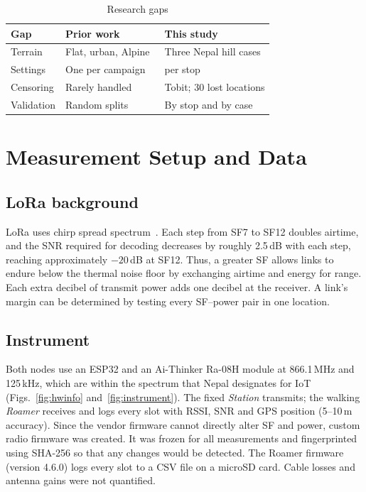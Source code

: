 \documentclass[conference]{IEEEtran}
\newcommand{\dB}{\,dB\xspace}
\begin{document}
\begin{table}[t]
\caption{Research gaps}\label{tab:gap}
\centering
\footnotesize
\setlength{\tabcolsep}{3pt}
\begin{tabular}{@{}>{\raggedright\arraybackslash}p{1.6cm}>{\raggedright\arraybackslash}p{3.1cm}>{\raggedright\arraybackslash}p{3.0cm}@{}}
\toprule
Gap & Prior work & This study \\
\midrule
Terrain & Flat, urban, Alpine~\cite{petajajarvi2015,rademacher2021,bianco2020} & Three Nepal hill cases \\
Settings & One per campaign~\cite{bianco2020} & 18 per stop \\
Censoring & Rarely handled~\cite{gustafson2015} & Tobit; 30 lost locations \\
Validation & Random splits~\cite{bitterling2026} & By stop and by case \\
\bottomrule
\end{tabular}
\end{table}

\section{Measurement Setup and Data}\label{sec:data}

\subsection{LoRa background}
LoRa uses chirp spread spectrum~\cite{semtech_an1200,augustin2016}. Each step from SF7 to SF12 doubles airtime, and the SNR required for decoding decreases by roughly 2.5\dB with each step, reaching approximately $-20$\dB at SF12. Thus, a greater SF allows links to endure below the thermal noise floor by exchanging airtime and energy for range. Each extra decibel of transmit power adds one decibel at the receiver. A link's margin can be determined by testing every SF--power pair in one location.

\subsection{Instrument}
Both nodes use an ESP32 and an Ai-Thinker Ra-08H module at 866.1\,MHz and 125\,kHz, which are within the spectrum that Nepal designates for IoT~\cite{nta2023} (Figs.~\ref{fig:hwinfo} and~\ref{fig:instrument}). The fixed \textit{Station} transmits; the walking \textit{Roamer} receives and logs every slot with RSSI, SNR and GPS position (5--10\,m accuracy). Since the vendor firmware cannot directly alter SF and power, custom radio firmware was created. It was frozen for all measurements and fingerprinted using SHA-256 so that any changes would be detected. The Roamer firmware (version 4.6.0) logs every slot to a CSV file on a microSD card. Cable losses and antenna gains were not quantified.
\end{document}
